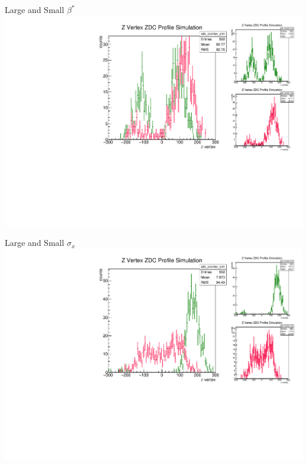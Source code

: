 \begin{frame}{Large and Small $\beta^*$}
\includegraphics[width=\linewidth,height=\textheight,keepaspectratio]{../HourglassParameterSpace/figs/beta_star.pdf}
\end{frame}

\begin{frame}{Large and Small $\sigma_{x}$}
\includegraphics[width=\linewidth,height=\textheight,keepaspectratio]{../HourglassParameterSpace/figs/hsigma.pdf}
\end{frame}

